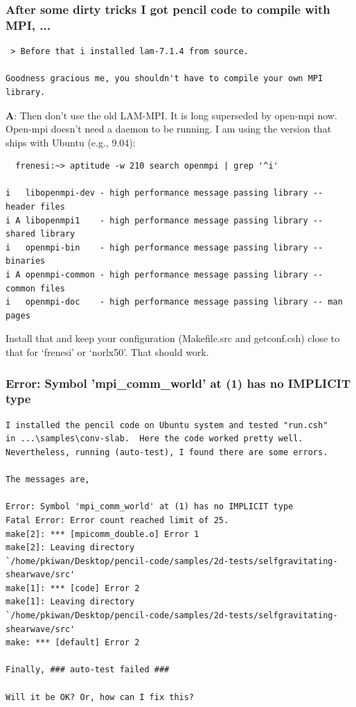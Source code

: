 \documentclass[\mydriver,12pt,twoside,notitlepage,a4paper]{article}
\begin{document}
\subsubsection{After some dirty tricks I got pencil code to compile with MPI, ...}

\begin{Verbatim}
 > Before that i installed lam-7.1.4 from source.

Goodness gracious me, you shouldn't have to compile your own MPI library.
\end{Verbatim}

\medskip

{\bf A}: Then don't use the old LAM-MPI. It is long superseded by open-mpi now.
Open-mpi doesn't need a daemon to be running. I am using the version that
ships with Ubuntu (e.g., 9.04):

\begin{Verbatim}
  frenesi:~> aptitude -w 210 search openmpi | grep '^i'

i   libopenmpi-dev - high performance message passing library -- header files
i A libopenmpi1    - high performance message passing library -- shared library
i   openmpi-bin    - high performance message passing library -- binaries
i A openmpi-common - high performance message passing library -- common files
i   openmpi-doc    - high performance message passing library -- man pages
\end{Verbatim}

Install that and keep your configuration (Makefile.src and getconf.csh)
close to that for `frenesi' or `norlx50'. That should work.

\subsubsection{Error: Symbol 'mpi_comm_world' at (1) has no IMPLICIT type}

\begin{Verbatim}
I installed the pencil code on Ubuntu system and tested "run.csh"
in ...\samples\conv-slab.  Here the code worked pretty well.
Nevertheless, running (auto-test), I found there are some errors.

The messages are,

Error: Symbol 'mpi_comm_world' at (1) has no IMPLICIT type
Fatal Error: Error count reached limit of 25.
make[2]: *** [mpicomm_double.o] Error 1
make[2]: Leaving directory
`/home/pkiwan/Desktop/pencil-code/samples/2d-tests/selfgravitating-shearwave/src'
make[1]: *** [code] Error 2
make[1]: Leaving directory
`/home/pkiwan/Desktop/pencil-code/samples/2d-tests/selfgravitating-shearwave/src'
make: *** [default] Error 2

Finally, ### auto-test failed ###

Will it be OK? Or, how can I fix this?
\end{Verbatim}
\end{document}
